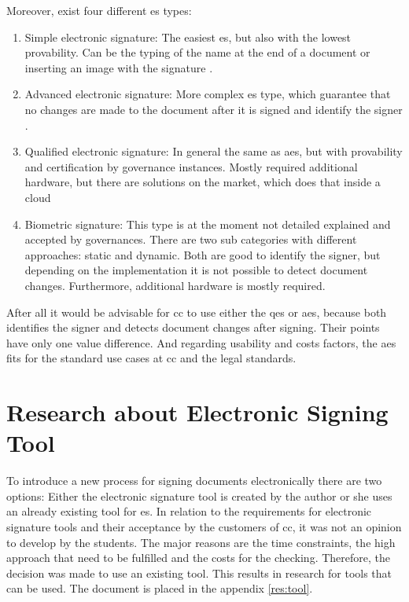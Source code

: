 Moreover, exist four different \gls{es} types:
\begin{enumerate}
	\item Simple electronic signature: The easiest \gls{es}, but also with the lowest provability. Can be the typing of the name at the end of a document or inserting an image with the signature \parencite{eIDAS2014,CEFd2018}.
	\item Advanced electronic signature: More complex \gls{es} type, which guarantee that no changes are made to the document after it is signed and identify the signer \parencite{eIDAS2014}.
	\item Qualified electronic signature: In general the same as \gls{aes}, but with provability and certification by governance instances. Mostly required additional hardware, but there are solutions on the market, which does that inside a cloud \parencite{eIDAS2014,CEFd2018} 
	\item Biometric signature: This type is at the moment not detailed explained and accepted by governances. There are two sub categories with different approaches: static and dynamic. Both are good to identify the signer, but depending on the implementation it is not possible to detect document changes. Furthermore, additional hardware is mostly required.
\end{enumerate}

After all it would be advisable for \gls{cc} to use either the \gls{qes} or \gls{aes}, because both identifies the signer and detects document changes after signing. Their points have only one value difference. And regarding usability and costs factors, the \gls{aes} fits for the standard use cases at \gls{cc} and the legal standards.

\section{Research about Electronic Signing Tool}
To introduce a new process for signing documents electronically there are two options: Either the electronic signature tool is created by the author or she uses an already existing tool for \gls{es}. In relation to the requirements for electronic signature tools and their acceptance by the customers of \gls{cc}, it was not an opinion to develop by the students. The major reasons are the time constraints, the high approach that need to be fulfilled and the costs for the checking. Therefore, the decision was made to use an existing tool. This results in research for tools that can be used. The document is placed in the appendix \ref{res:tool}. 

